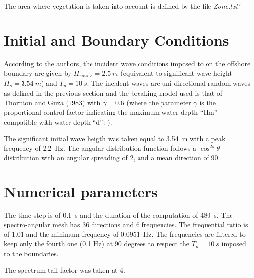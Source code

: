 The area where vegetation is taken into account is defined by the file
{\it Zone.txt'}

\section{Initial and Boundary Conditions}
%
According to the authors, the incident wave conditions imposed to \tomawac
on the offshore boundary are given by $H_{rms,o} = 2.5~m$ (equivalent to
significant wave height $H_s = 3.54~m$) and $T_p = 10~s$. The incident waves
are uni-directional random waves as defined in the previous section and the
breaking model used is that of Thornton and Guza (1983) with  $\gamma=0.6$
(where the parameter $\gamma$  is the proportional control factor indicating
the maximum water depth “Hm” compatible with water depth “d”: ).

The significant initial wave heigth was taken equal to 3.54~m with a peak
frequency of 2.2~Hz. The angular distribution function follows a $\cos^{2s}
\theta$ distribution with an angular spreading of 2, and a mean direction of 90.

\section{Numerical parameters}
%
The time step is of 0.1~s and the duration of the computation of 480~s. The
spectro-angular mesh has 36 directions and 6 frequencies. The frequential ratio
is of 1.01 and the minimum frequency of 0.0951~Hz. The frequencies are filtered
to keep only the fourth one (0.1 Hz) at 90 degrees to respect the $T_p= 10~s$
imposed to the boundaries.

The spectrum tail factor was taken at 4.

